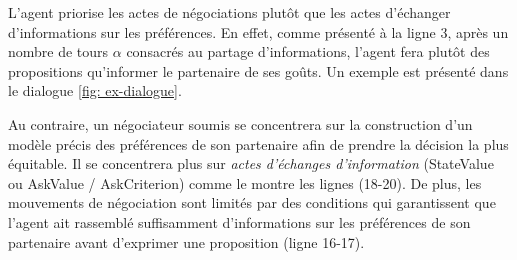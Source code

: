 	L'agent priorise les actes de négociations plutôt que les actes d'échanger d'informations sur les préférences. En effet, comme présenté à la ligne 3, après un nombre de tours $ \alpha $ consacrés au partage d'informations, l'agent fera plutôt des propositions qu'informer le partenaire de ses goûts. Un exemple est présenté dans le dialogue \ref{fig: ex-dialogue}.
	
	Au contraire, un négociateur soumis se concentrera sur la construction d'un modèle précis des préférences de son partenaire afin de prendre la décision la plus équitable. Il se concentrera plus sur \emph {actes d'échanges d'information} (StateValue ou AskValue / AskCriterion) comme le montre les lignes (18-20). De plus, les mouvements de négociation sont limités par des conditions qui garantissent que l'agent ait rassemblé suffisamment d'informations sur les préférences de son partenaire avant d'exprimer une proposition (ligne 16-17).
	
	
	
